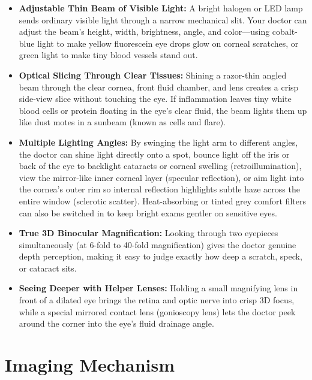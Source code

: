 \begin{itemize}
    \item \textbf{Adjustable Thin Beam of Visible Light:} A bright halogen or LED lamp sends ordinary visible light through a narrow mechanical slit. Your doctor can adjust the beam's height, width, brightness, angle, and color---using cobalt-blue light to make yellow fluorescein eye drops glow on corneal scratches, or green light to make tiny blood vessels stand out.
    \item \textbf{Optical Slicing Through Clear Tissues:} Shining a razor-thin angled beam through the clear cornea, front fluid chamber, and lens creates a crisp side-view slice without touching the eye. If inflammation leaves tiny white blood cells or protein floating in the eye's clear fluid, the beam lights them up like dust motes in a sunbeam (known as cells and flare).
    \item \textbf{Multiple Lighting Angles:} By swinging the light arm to different angles, the doctor can shine light directly onto a spot, bounce light off the iris or back of the eye to backlight cataracts or corneal swelling (retroillumination), view the mirror-like inner corneal layer (specular reflection), or aim light into the cornea's outer rim so internal reflection highlights subtle haze across the entire window (sclerotic scatter). Heat-absorbing or tinted grey comfort filters can also be switched in to keep bright exams gentler on sensitive eyes.
    \item \textbf{True 3D Binocular Magnification:} Looking through two eyepieces simultaneously (at 6-fold to 40-fold magnification) gives the doctor genuine depth perception, making it easy to judge exactly how deep a scratch, speck, or cataract sits.
    \item \textbf{Seeing Deeper with Helper Lenses:} Holding a small magnifying lens in front of a dilated eye brings the retina and optic nerve into crisp 3D focus, while a special mirrored contact lens (gonioscopy lens) lets the doctor peek around the corner into the eye's fluid drainage angle.
\end{itemize}

\section{Imaging Mechanism}

